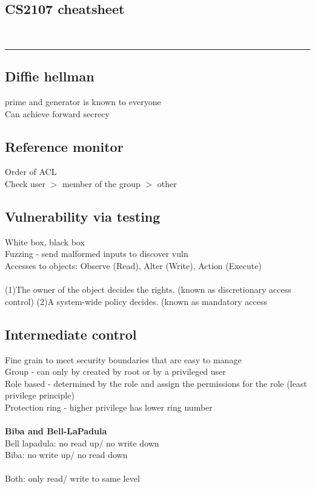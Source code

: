 \documentclass[11pt]{article}
\begin{document}
\setlength{\columnsep}{1cm}
\begin{multicols*}{3}
\section*{CS2107 cheatsheet}\\
{\color{Purple} \rule{\linewidth}{0.5mm} }
\subsection*{Diffie hellman}
prime and generator is known to everyone\\
Can achieve forward secrecy
\subsection*{Reference monitor}
Order of ACL\\
Check user $>$ member of the group $>$ other
\subsection*{Vulnerability via testing}
White box, black box\\
Fuzzing - send malformed inputs to discover vuln
\\
Accesses to objects: Observe (Read), Alter (Write), Action (Execute)\\
\\
(1)The owner of the object decides the rights. (known as 
discretionary access control)
(2)A system-wide policy decides.  (known as mandatory access 
\subsection*{ Intermediate control}
Fine grain to meet security boundaries that are easy to manage\\
Group - can only by created by root or by a privileged user\\
Role based - determined by the role and assign the permissions for the role (least privilege principle)\\
Protection ring - higher privilege has lower ring number\\
\\
\textrm{\textbf{ Biba and Bell-LaPadula}}\\
Bell lapadula: no read up/ no write down\\
Biba: no write up/ no read down\\
\\
Both: only read/ write to same level\\

\end{multicols*}
\end{document}
